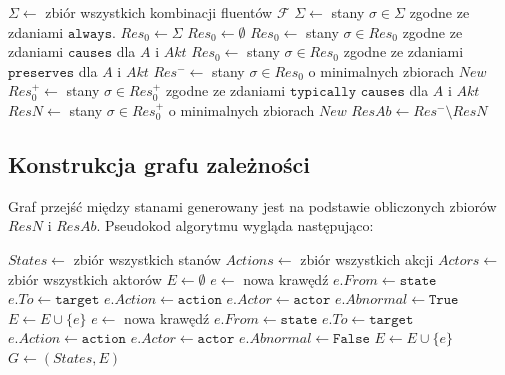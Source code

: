 \documentclass{article}
\begin{document}
\begin{algorithm}[H]
\begin{algorithmic}
\State $\Sigma \gets $ zbiór wszystkich kombinacji fluentów $\mathcal{F}$
\State $\Sigma \gets$ stany $\sigma \in \Sigma$ zgodne ze zdaniami $\texttt{always}$.
\State $Res_0 \gets \Sigma$
	\State $Res_0 \gets \emptyset$ 
\EndIf
\State $Res_0 \gets$ stany $\sigma \in Res_0$ zgodne ze zdaniami $\texttt{causes}$ dla $A$ i $Akt$
\State $Res_0 \gets$ stany $\sigma \in Res_0$ zgodne ze zdaniami $\texttt{preserves}$ dla $A$ i $Akt$
\State $Res^- \gets$ stany $\sigma \in Res_0$ o minimalnych zbiorach $New$
\State $Res^+_0 \gets$ stany $\sigma \in Res^+_0$ zgodne ze zdaniami $\texttt{typically causes}$ dla $A$ i $Akt$
\State $ResN \gets$ stany $\sigma \in Res^+_0$ o minimalnych zbiorach $New$
\State $ResAb \gets Res^- \setminus ResN$ 
\end{algorithmic}
\end{algorithm}

\newpage
\subsection{Konstrukcja grafu zależności}

Graf przejść między stanami generowany jest na podstawie obliczonych zbiorów $ResN$ i $ResAb$. Pseudokod algorytmu wygląda następująco:

\begin{algorithm}[H]
\begin{algorithmic}
\State $States \gets $ zbiór wszystkich stanów
\State $Actions \gets $ zbiór wszystkich akcji
\State $Actors \gets $ zbiór wszystkich aktorów
\State $E \gets \emptyset$
				\State $e \gets$ nowa krawędź
				\State $e.From \gets \texttt{state}$
				\State $e.To \gets \texttt{target}$
				\State $e.Action \gets \texttt{action}$
				\State $e.Actor \gets \texttt{actor}$
				\State $e.Abnormal \gets \texttt{True}$
				\State $E \gets E \cup \{e\}$
			\EndFor
				\State $e \gets$ nowa krawędź
				\State $e.From \gets \texttt{state}$
				\State $e.To \gets \texttt{target}$
				\State $e.Action \gets \texttt{action}$
				\State $e.Actor \gets \texttt{actor}$
				\State $e.Abnormal \gets \texttt{False}$
				\State $E \gets E \cup \{e\}$
			\EndFor
		\EndFor
	\EndFor
\EndFor
\State $G \gets \left(States, E\right)$
\end{algorithmic}
\end{algorithm}
\end{document}

